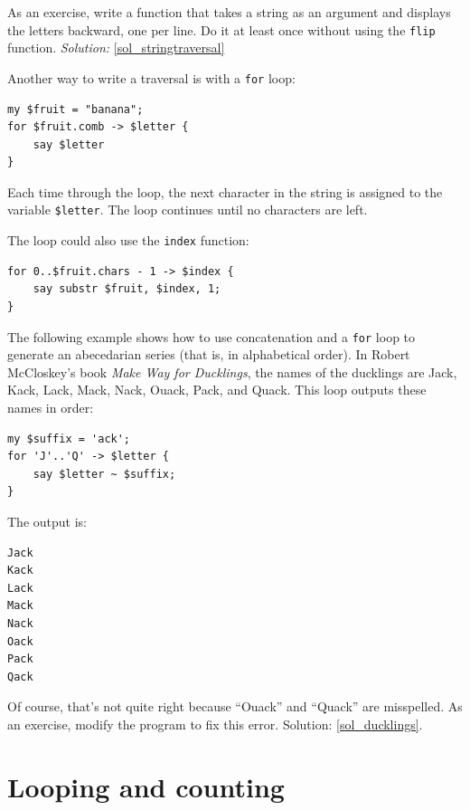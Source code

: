 As an exercise, write a function that takes a string as 
an argument and displays the letters backward, one 
per line. Do it at least once without using the 
{\tt flip} function. \emph{Solution: } \ref{sol_stringtraversal}

Another way to write a traversal is with a {\tt for} loop:

\begin{verbatim}
my $fruit = "banana";
for $fruit.comb -> $letter {
    say $letter
}
\end{verbatim}
%

Each time through the loop, the next character in the string 
is assigned to the variable {\tt \$letter}.  The loop 
continues until no characters are left.

The loop could also use the {\tt index} function:

\begin{verbatim}
for 0..$fruit.chars - 1 -> $index {
    say substr $fruit, $index, 1;
}
\end{verbatim}
%


The following example shows how to use concatenation and a 
{\tt for} loop to generate an abecedarian series (that is, in
alphabetical order).  In Robert McCloskey's book {\em Make
Way for Ducklings}, the names of the ducklings are Jack, Kack, Lack,
Mack, Nack, Ouack, Pack, and Quack.  This loop outputs these names in
order:

\begin{verbatim}
my $suffix = 'ack';
for 'J'..'Q' -> $letter {
    say $letter ~ $suffix;
}
\end{verbatim}
%
The output is:

\begin{verbatim}
Jack
Kack
Lack
Mack
Nack
Oack
Pack
Qack
\end{verbatim}
%
Of course, that's not quite right because ``Ouack'' and 
``Quack'' are misspelled.  As an exercise, modify the program 
to fix this error. Solution: \ref{sol_ducklings}.


\section{Looping and counting}
\label{counter}

